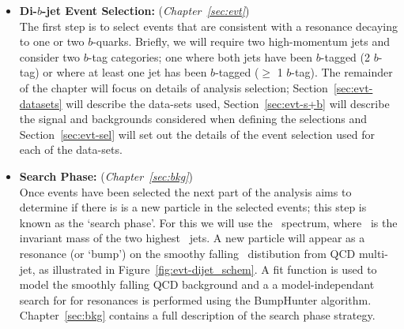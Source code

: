 \begin{itemize}[leftmargin=*]
\item\textbf{Di-$b$-jet Event Selection:} (\textit{Chapter~\ref{sec:evt}})\\
  The first step is to select events that are consistent with a resonance decaying to one or two $b$-quarks.
  Briefly, we will require two high-momentum jets and consider two $b$-tag categories;
  one where both jets have been $b$-tagged (2 $b$-tag) or where at least one jet has been $b$-tagged ($\geq$ 1 $b$-tag).
  The remainder of the chapter will focus on details of analysis selection;
  Section~\ref{sec:evt-datasets} will describe the data-sets used,
  Section~\ref{sec:evt-s+b} will describe the signal and backgrounds
  considered when defining the selections
  and Section~\ref{sec:evt-sel} will set out
  the details of the event selection used for each of the data-sets.
  \\
\item\textbf{Search Phase:} (\textit{Chapter~\ref{sec:bkg}})\\
  Once events have been selected the next part of the analysis aims to determine if there is
  is a new particle in the selected events; this step is known as the `search phase'.
  For this we will use the \mjj~spectrum, where \mjj~is the invariant mass of the two highest \pT~jets.
  A new particle will appear as a resonance (or `bump') on the smoothy falling
  \mjj~distibution from QCD multi-jet, as illustrated in Figure~\ref{fig:evt-dijet_schem}.
  A fit function is used to model the smoothly falling QCD background and a
  a model-independant search for for resonances is performed using the BumpHunter algorithm.
  Chapter~\ref{sec:bkg} contains a full description of the search phase strategy.
  \\
  

\end{itemize}
